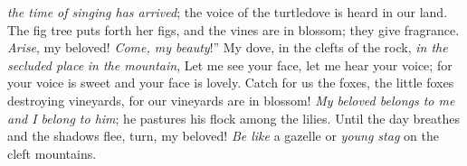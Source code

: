 \begin{biblechapter}
\textit{the time of singing has arrived}; 
the voice of the turtledove is heard in our land.
\verse The fig tree puts forth her figs, 
and the vines are in blossom; they give fragrance. 
\textit{Arise}, my beloved! \textit{Come, my beauty}!”
\verse My dove, in the clefts of the rock, 
\textit{in the secluded place} \textit{in the mountain}, 
Let me see your face, 
let me hear your voice; 
for your voice is sweet and your face is lovely.
\verse Catch for us the foxes, 
the little foxes destroying vineyards, 
for our vineyards are in blossom!
 \textit{My beloved belongs to me and I belong to him}; 
he pastures his flock among the lilies.
\verse Until the day breathes and the shadows flee, 
turn, my beloved! 
\textit{Be like} a gazelle or \textit{young stag} on the cleft mountains.
\end{biblechapter}


